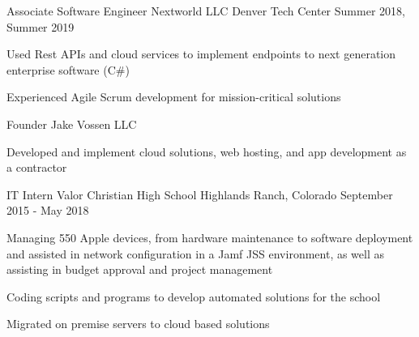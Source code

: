 

\begin{cventries}

  \cventry
    {Associate Software Engineer} %
    {Nextworld LLC} %
    {Denver Tech Center} %
    {Summer 2018, Summer 2019} %
    {
      \begin{cvitems} %
        \item {Used Rest APIs and cloud services to implement
            endpoints to next generation enterprise software (C\#)}
        \item {Experienced Agile Scrum development for mission-critical solutions}
      \end{cvitems}
    }

  \cventry
    {Founder}
    {Jake Vossen LLC} %
    {} %
    { }
    {
      \begin{cvitems} %
        \item {Developed and implement cloud solutions, web hosting,
            and app development as a contractor}
      \end{cvitems}
    }

  \cventry
    {IT Intern}
    {Valor Christian High School }
    {Highlands Ranch, Colorado} %
    {September 2015 - May 2018} %
    {
      \begin{cvitems} %
        \item {Managing 550 Apple devices, from hardware maintenance
            to software deployment and assisted in network
            configuration in a Jamf JSS environment, as well as
            assisting in budget approval and project management}
        \item {Coding scripts and programs to develop automated
            solutions for the school}
        \item {Migrated on premise servers to cloud based solutions}
      \end{cvitems}
    }
\end{cventries}
